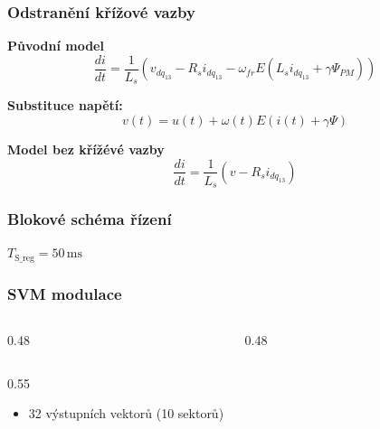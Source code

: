 \documentclass[%
  12pt,       				%
	t,                  %
	aspectratio=1610,   %
	unicode,						%
]{beamer}				    	%
\begin{document}
\begin{frame}
\frametitle{Odstranění křížové vazby}
\textbf{Původní model}
\begin{equation}
    \label{eq:ss idq s kriz}
     \frac{di}{dt} = \frac{1}{L_s} \left( v_{dq_{13}} - R_s i_{dq_{13}} - \omega_{fr}E \left( L_{s}i_{dq_{13}} + \gamma \Psi_{PM}\right) \right)
\end{equation}

\textbf{Substituce napětí:}
\begin{equation}
\label{eq:substituce v}
    v(t)=u(t) +  \omega(t) E \left(  i(t) + \gamma \Psi\right)
\end{equation}

\textbf{Model bez křížévé vazby}
\begin{equation}
    \label{eq:proud bez krize}
     \frac{di}{dt} = \frac{1}{L_s} \left( v - R_s i_{dq_{13}}  \right)
\end{equation}

\end{frame}

\begin{frame}
	\frametitle{Blokové schéma řízení}
	\vfill
	
	\vfill
	\begin{center}
		\footnotesize $T_\mathrm{S\_reg} = 50\,\text{ms}$
	\end{center}
\end{frame}

\begin{frame}
	\frametitle{SVM modulace}
	\begin{columns}
		\begin{column}{0.48\textwidth}
			\centering
			
		\end{column}
		\begin{column}{0.48\textwidth}
			\centering
			
		\end{column}
	\end{columns}
	\vspace{0.5em}
	\begin{columns}
		\begin{column}{0.55\textwidth}
			\begin{itemize}
				\item 32 výstupních vektorů (10 sektorů)
			\end{itemize}
		\end{column}
		
	\end{columns}
\end{frame}
\end{document}
